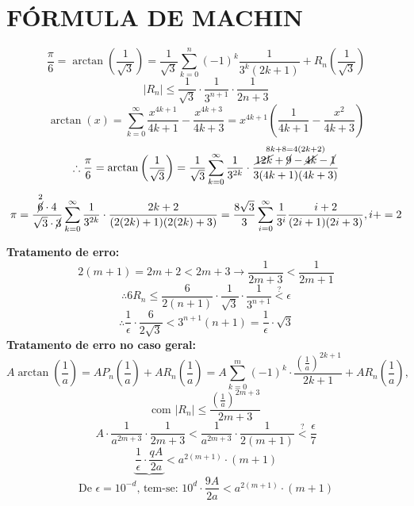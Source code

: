 \documentclass[a4paper, 12pt]{article}
\begin{document}
   \section{FÓRMULA DE MACHIN} 
    
  \begin{center}
    \[
     \frac{\pi}{6} = \arctan\left(\frac{1}{\sqrt{3}}\right) = \frac{1}{\sqrt{3}} \sum_{k=0}^{n} (-1)^k \frac{1}{3^k(2k+1)} + R_n\left(\frac{1}{\sqrt{3}}\right)
    \]
    \[
    |R_n| \leq \frac{1}{\sqrt{3}} \cdot \frac{1}{3^{n+1}} \cdot \frac{1}{2n+3}
    \]
    \[
     \arctan\left(x\right) = \sum_{k=0}^{\infty} \frac{x^{4k+1}}{4k+1} - \frac{x^{4k+3}}{4k+3} = x^{4k+1} (\frac{1}{4k+1} - \frac{x^2}{4k+3})
    \]
    \[
     \therefore \frac{\pi}{6} = \arctan\left(\frac{1}{\sqrt{3}}\right) = \frac{1}{\sqrt{3}} \sum_{k=0}^{\infty} \frac{1}{3^{2k}} \cdot \frac{\overset{8k+8 = 4(2k+2)}{\cancel{12k} + \cancel{9} - \cancel{4k} - \cancel{1}}}{3(4k+1)(4k+3)}
    \]
    \[
     \pi = \frac{\overset{2}{\cancel{6}} \cdot 4}{\sqrt{3} \cdot \cancel{3}} \sum_{k=0}^{\infty} \frac{1}{3^{2k}} \cdot \frac{2k+2}{(2(2k)+1)(2(2k)+3)} = \frac{8 \sqrt{3}}{3} \sum_{i=0}^{\infty} \frac{1}{3^i}\frac{i+2}{(2i+1)(2i+3)} , i+=2
    \]

\end{center}
\textbf{Tratamento de erro:}
    \[
    2(m+1) = 2m+2 < 2m+3 \to \frac{1}{2m+3} < \frac{1}{2m+1}
    \]
    \[
    \therefore 6R_n \leq \frac{6}{2(n+1)} \cdot \frac{1}{\sqrt{3}} \cdot \frac{1}{3^{n+1}} \overset{?}{<} \epsilon
    \]
    \[
    \therefore \frac{1}{\epsilon} \cdot \frac{6}{2\sqrt{3}} < 3^{n+1}(n+1) = \frac{1}{\epsilon} \cdot \sqrt{3}
    \]
\textbf{Tratamento de erro no caso geral:}
    \[
    A \arctan\left(\frac{1}{a}\right) = A P_n (\frac{1}{a}) + A R_n (\frac{1}{a}) = A \sum_{k=0}^{m} (-1)^k \cdot \frac{(\frac{1}{a})^{2k+1}}{2k+1} + A R_n (\frac{1}{a}) ,
    \]
    \[
    \text{com } |R_n| \leq \frac{(\frac{1}{a})^{2m+3}}{2m+3}
    \]      
    \[
    A \cdot \frac{1}{a^{2m+3}} \cdot \frac{1}{2m+3} < \frac{1}{a^{2m+3}} \cdot \frac{1}{2(m+1)} \overset{?}{<} \frac{\epsilon}{7}
    \]
    \[
    \underbrace{\frac{1}{\epsilon} \cdot \frac{qA}{2a}} < a^{2(m+1)} \cdot (m+1)
    \] 
    \[
    \text{De } \epsilon = 10^{-d}\text{, tem-se: } 10^d \cdot \frac{9A}{2a} < a^{2(m+1)} \cdot (m+1)
    \] 
\end{document}
